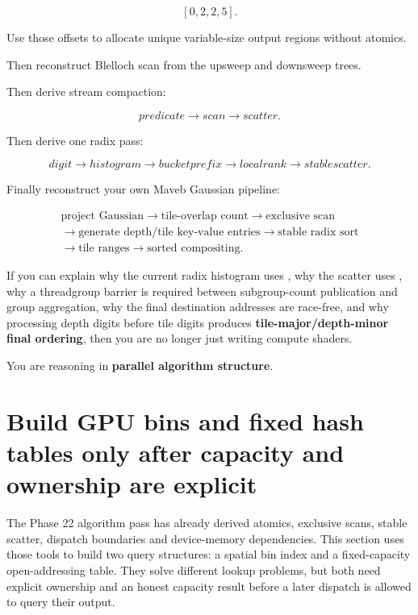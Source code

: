 \[
[0,2,2,5].
\]

Use those offsets to allocate unique variable-size output regions without atomics.

Then reconstruct Blelloch scan from the upsweep and downsweep trees.

Then derive stream compaction:

\[
predicate
\rightarrow
scan
\rightarrow
scatter.
\]

Then derive one radix pass:

\[
digit
\rightarrow
histogram
\rightarrow
bucket prefix
\rightarrow
local rank
\rightarrow
stable scatter.
\]

Finally reconstruct your own Maveb Gaussian pipeline:

\[\begin{gathered}\text{project Gaussian}\rightarrow\text{tile-overlap count}\rightarrow\text{exclusive scan}\\\rightarrow\text{generate depth/tile key-value entries}\rightarrow\text{stable radix sort}\\\rightarrow\text{tile ranges}\rightarrow\text{sorted compositing}.\end{gathered}\]

If you can explain why the current radix histogram uses , why the scatter uses , why a threadgroup barrier is required between subgroup-count publication and group aggregation, why the final destination addresses are race-free, and why processing depth digits before tile digits produces \textbf{tile-major/depth-minor final ordering}, then you are no longer just writing compute shaders.

You are reasoning in \textbf{parallel algorithm structure}.

\section{Build GPU bins and fixed hash tables only after capacity and ownership are explicit}\label{03-visual-computing-i-ch016-build-gpu-bins-and-fixed-hash-tables-only-after-capacity-and-ownership-are-explicit}

\hypertarget{03-visual-computing-i-ch016-build-gpu-bins-and-fixed-hash-tables-only-after-capacity-and-ownership-are-explicit}{}

The Phase 22 algorithm pass has already derived atomics, exclusive scans, stable scatter, dispatch boundaries and device-memory dependencies. This section uses those tools to build two query structures: a spatial bin index and a fixed-capacity open-addressing table. They solve different lookup problems, but both need explicit ownership and an honest capacity result before a later dispatch is allowed to query their output.

